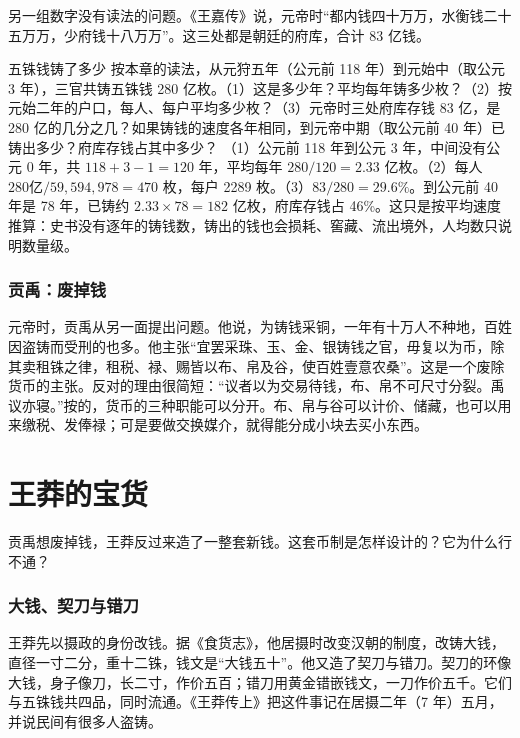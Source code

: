 另一组数字没有读法的问题。《王嘉传》说，元帝时“都内钱四十万万，水衡钱二十五万万，少府钱十八万万”\cite{hanshu}。这三处都是朝廷的府库，合计 83 亿钱。

\begin{example}{五铢钱铸了多少}\label{ex:qinhan-cast}
按本章的读法，从元狩五年（公元前 118 年）到元始中（取公元 3 年），三官共铸五铢钱 280 亿枚。（1）这是多少年？平均每年铸多少枚？（2）按元始二年的户口，每人、每户平均多少枚？（3）元帝时三处府库存钱 83 亿，是 280 亿的几分之几？如果铸钱的速度各年相同，到元帝中期（取公元前 40 年）已铸出多少？府库存钱占其中多少？
\solution （1）公元前 118 年到公元 3 年，中间没有公元 0 年，共 $118+3-1=120$ 年，平均每年 $280/120=2.33$ 亿枚。（2）每人 $280\text{亿}/59{,}594{,}978=470$ 枚，每户 2289 枚。（3）$83/280=29.6\%$。到公元前 40 年是 78 年，已铸约 $2.33\times78=182$ 亿枚，府库存钱占 46\%。这只是按平均速度推算：史书没有逐年的铸钱数，铸出的钱也会损耗、窖藏、流出境外，人均数只说明数量级。
\end{example}

\subsubsection{贡禹：废掉钱}
元帝时，贡禹从另一面提出问题。他说，为铸钱采铜，一年有十万人不种地，百姓因盗铸而受刑的也多。他主张“宜罢采珠、玉、金、银铸钱之官，毋复以为币，除其卖租铢之律，租税、禄、赐皆以布、帛及谷，使百姓壹意农桑”\cite{hanshu}。这是一个废除货币的主张。反对的理由很简短：“议者以为交易待钱，布、帛不可尺寸分裂。禹议亦寝。”\cite{hanshu}按的，货币的三种职能可以分开。布、帛与谷可以计价、储藏，也可以用来缴税、发俸禄；可是要做交换媒介，就得能分成小块去买小东西。

\section{王莽的宝货}\label{sec:qinhan-wangmang}

贡禹想废掉钱，王莽反过来造了一整套新钱。这套币制是怎样设计的？它为什么行不通？

\subsubsection{大钱、契刀与错刀}
王莽先以摄政的身份改钱。据《食货志》，他居摄时改变汉朝的制度，改铸大钱，直径一寸二分，重十二铢，钱文是“大钱五十”。他又造了契刀与错刀。契刀的环像大钱，身子像刀，长二寸，作价五百；错刀用黄金错嵌钱文，一刀作价五千。它们与五铢钱共四品，同时流通\cite{hanshu}。《王莽传上》把这件事记在居摄二年（7 年）五月，并说民间有很多人盗铸\cite{hanshu}。

